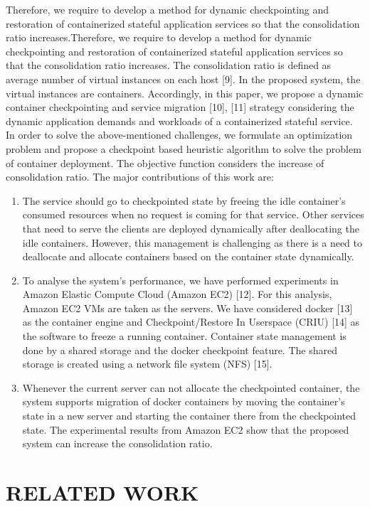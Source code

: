 \documentclass[conference]{IEEEtran}
\begin{document}
Therefore, we require to develop a method for dynamic
checkpointing and restoration of containerized stateful application services so that the consolidation ratio increases.Therefore, we require to develop a method for dynamic
checkpointing and restoration of containerized stateful application services so that the consolidation ratio increases.
The consolidation ratio is defined as average number of
virtual instances on each host [9]. In the proposed system,
the virtual instances are containers. Accordingly, in this paper,
we propose a dynamic container checkpointing and service
migration [10], [11] strategy considering the dynamic application demands and workloads of a containerized stateful
service. In order to solve the above-mentioned challenges, we
formulate an optimization problem and propose a checkpoint
based heuristic algorithm to solve the problem of container
deployment. The objective function considers the increase of consolidation ratio. The major contributions of this work are:
\begin{enumerate}[i]
\item The service should go to checkpointed state by freeing
the idle container’s consumed resources when no request
is coming for that service. Other services that need to
serve the clients are deployed dynamically after deallocating the idle containers. However, this management is
challenging as there is a need to deallocate and allocate
containers based on the container state dynamically.
\item  To analyse the system’s performance, we have performed
experiments in Amazon Elastic Compute Cloud (Amazon
EC2) [12]. For this analysis, Amazon EC2 VMs are taken
as the servers. We have considered docker [13] as the
container engine and Checkpoint/Restore In Userspace
(CRIU) [14] as the software to freeze a running container.
Container state management is done by a shared storage
and the docker checkpoint feature. The shared storage is
created using a network file system (NFS) [15].
\item Whenever the current server can not allocate the checkpointed container, the system supports migration of
docker containers by moving the container’s state in a
new server and starting the container there from the
checkpointed state. The experimental results from Amazon EC2 show that the proposed system can increase the
consolidation ratio.
\end{enumerate}

\section{RELATED WORK}
\end{document}
